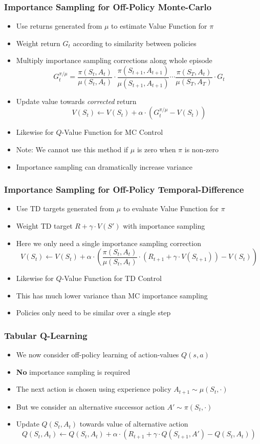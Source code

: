 \documentclass[handout]{beamer}
\begin{document}
\begin{frame}
\frametitle{Importance Sampling for Off-Policy Monte-Carlo}
\pause
\begin{itemize}[<+->]
\item Use returns generated from $\mu$ to estimate Value Function for $\pi$
\item Weight return $G_t$ according to similarity between policies
\item Multiply importance sampling corrections along whole episode
$$G_t^{\pi / \mu} = \frac {\pi(S_t, A_t)} {\mu(S_t, A_t)} \cdot  \frac {\pi(S_{t+1}, A_{t+1})} {\mu(S_{t+1}, A_{t+1})} \cdots \frac {\pi(S_T, A_t)} {\mu(S_T, A_T)} \cdot G_t$$
\item Update value towards {\em corrected} return
$$V(S_t) \leftarrow V(S_t) + \alpha \cdot (G_t^{\pi / \mu} - V(S_t))$$
\item Likewise for $Q$-Value Function for MC Control
\item Note: We cannot use this method if $\mu$ is zero when $\pi$ is non-zero
\item Importance sampling can dramatically increase variance
\end{itemize}
\end{frame}

\begin{frame}
\frametitle{Importance Sampling for Off-Policy Temporal-Difference}
\pause
\begin{itemize}[<+->]
\item  Use TD targets generated from $\mu$ to evaluate Value Function for $\pi$
\item Weight TD target $R + \gamma \cdot V(S')$ with importance sampling
\item Here we only need a single importance sampling correction
$$V(S_t) \leftarrow V(S_t) + \alpha \cdot ( \frac {\pi(S_t, A_t)} {\mu(S_t, A_t)} \cdot (R_{t+1} + \gamma \cdot V(S_{t+1})) - V(S_t))$$
\item Likewise for $Q$-Value Function for TD Control
\item This has much lower variance than MC importance sampling
\item Policies only need to be similar over a single step
\end{itemize}
\end{frame}

\begin{frame}
\frametitle{Tabular Q-Learning}
\pause
\begin{itemize}[<+->]
\item We now consider off-policy learning of action-values $Q(s,a)$
\item {\bf No} importance sampling is required
\item The next action is chosen using experience policy $A_{t+1} \sim \mu(S_t,\cdot)$
\item But we consider an alternative successor action $A' \sim \pi(S_t, \cdot)$
\item Update $Q(S_t, A_t)$ towards value of alternative action
$$Q(S_t, A_t) \leftarrow Q(S_t, A_t) + \alpha \cdot (R_{t+1} + \gamma \cdot Q(S_{t+1}, A') - Q(S_t, A_t))$$ 
\end{itemize}
\end{frame}
\end{document}
